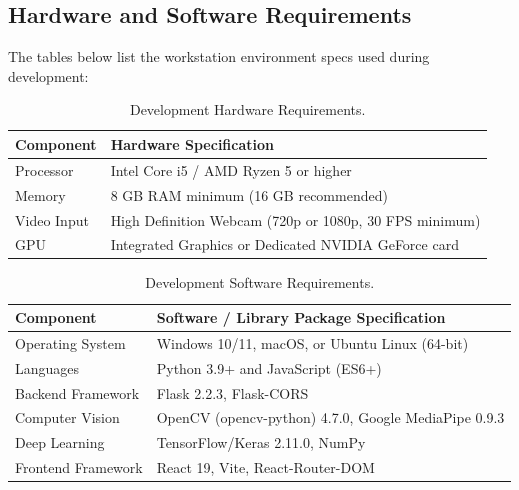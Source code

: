 \subsection{Hardware and Software Requirements}
The tables below list the workstation environment specs used during development:
\begin{table}[h]
\centering
\begin{tabular}{|p{4.0cm}|p{11.8cm}|}
\hline
\textbf{Component} & \textbf{Hardware Specification} \\ \hline
Processor & Intel Core i5 / AMD Ryzen 5 or higher \\ \hline
Memory & 8 GB RAM minimum (16 GB recommended) \\ \hline
Video Input & High Definition Webcam (720p or 1080p, 30 FPS minimum) \\ \hline
GPU & Integrated Graphics or Dedicated NVIDIA GeForce card \\ \hline
\end{tabular}
\caption{Development Hardware Requirements.}
\label{tab:hardware_reqs}
\end{table}

\begin{table}[h]
\centering
\begin{tabular}{|p{4.0cm}|p{11.8cm}|}
\hline
\textbf{Component} & \textbf{Software / Library Package Specification} \\ \hline
Operating System & Windows 10/11, macOS, or Ubuntu Linux (64-bit) \\ \hline
Languages & Python 3.9+ and JavaScript (ES6+) \\ \hline
Backend Framework & Flask 2.2.3, Flask-CORS \\ \hline
Computer Vision & OpenCV (opencv-python) 4.7.0, Google MediaPipe 0.9.3 \\ \hline
Deep Learning & TensorFlow/Keras 2.11.0, NumPy \\ \hline
Frontend Framework & React 19, Vite, React-Router-DOM \\ \hline
\end{tabular}
\caption{Development Software Requirements.}
\label{tab:software_reqs}
\end{table}
\newpage
